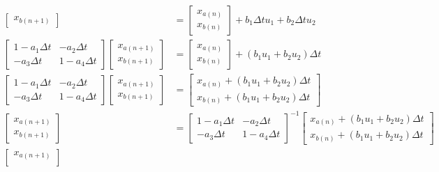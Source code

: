 \documentclass[11pt]{article}
\begin{document}
\begin{subequations}
\begin{align}
\begin{bmatrix}
      x_{b(n+1)}
    \end{bmatrix} &=
    \begin{bmatrix}
      x_{a(n)} \\
      x_{b(n)}
    \end{bmatrix} +
    b_1\Delta t u_1 + b_2\Delta t u_2 \\
    \begin{bmatrix}
      1 - a_1\Delta t & - a_2\Delta t \\
      - a_3\Delta t & 1 - a_4\Delta t
    \end{bmatrix}
    \begin{bmatrix}
      x_{a(n+1)} \\
      x_{b(n+1)}
    \end{bmatrix} &=
    \begin{bmatrix}
      x_{a(n)} \\
      x_{b(n)}
    \end{bmatrix} +
    (b_1 u_1 + b_2 u_2)\Delta t \\
    \begin{bmatrix}
      1 - a_1\Delta t & - a_2\Delta t \\
      - a_3\Delta t & 1 - a_4\Delta t
    \end{bmatrix}
    \begin{bmatrix}
      x_{a(n+1)} \\
      x_{b(n+1)}
    \end{bmatrix} &=
    \begin{bmatrix}
      x_{a(n)} + (b_1 u_1 + b_2 u_2)\Delta t \\
      x_{b(n)} + (b_1 u_1 + b_2 u_2)\Delta t
    \end{bmatrix} \\
    \begin{bmatrix}
      x_{a(n+1)} \\
      x_{b(n+1)}
    \end{bmatrix} &=
    \begin{bmatrix}
      1 - a_1\Delta t & - a_2\Delta t \\
      - a_3\Delta t & 1 - a_4\Delta t
    \end{bmatrix} ^{-1}
    \begin{bmatrix}
      x_{a(n)} + (b_1 u_1 + b_2 u_2)\Delta t \\
      x_{b(n)} + (b_1 u_1 + b_2 u_2)\Delta t
    \end{bmatrix} \\
    \begin{bmatrix}
      x_{a(n+1)} \\

\end{bmatrix}
\end{align}
\end{subequations}
\end{document}
